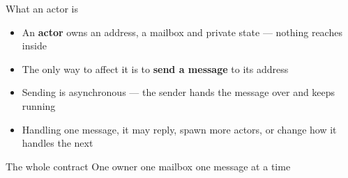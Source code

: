 \begin{frame}{What an actor is}
  \begin{itemize}
    \item An \textbf{actor} owns an address, a mailbox and private state --- nothing reaches inside
    \item The only way to affect it is to \textbf{send a message} to its address
    \item Sending is asynchronous --- the sender hands the message over and keeps running
    \item Handling one message, it may reply, spawn more actors, or change how it handles the next
  \end{itemize}
  \vspace{0.2cm}
  \begin{block}{The whole contract}
    One owner \textperiodcentered{} one mailbox \textperiodcentered{} one message at a time
  \end{block}
\end{frame}

